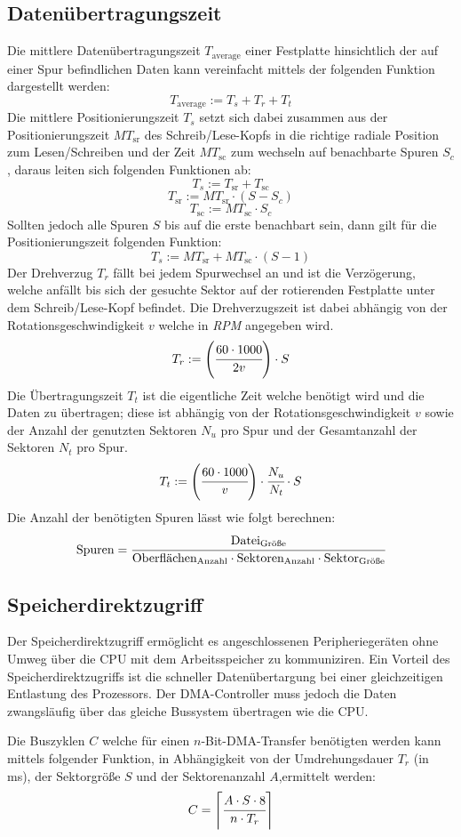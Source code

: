 \subsection{Datenübertragungszeit}
Die mittlere Datenübertragungszeit $T_{\text{average}}$ einer
Festplatte hinsichtlich der auf einer Spur befindlichen Daten kann
vereinfacht mittels der folgenden Funktion dargestellt werden:
\[
    T_{\text{average}} := T_{s} + T_{r} + T_{t}
\]
Die mittlere Positionierungszeit $T_{s}$ setzt sich dabei zusammen aus der 
Positionierungszeit $MT_{\text{sr}}$ des Schreib/Lese-Kopfs in die
richtige radiale Position zum Lesen/Schreiben und der Zeit $MT_{\text{sc}}$
zum wechseln auf benachbarte Spuren $S_{c}$, daraus leiten sich folgenden Funktionen ab:
\[
 T_{s} := T_{\text{sr}} + T_{\text{sc}}
\]
\[
 T_{\text{sr}} := MT_{\text{sr}}\cdot (S-S_{c})
\]
\[
 T_{\text{sc}} := MT_{\text{sc}}\cdot S_{c}
\]
Sollten jedoch alle Spuren $S$ bis auf die erste benachbart sein, dann gilt für
die Positionierungszeit folgenden Funktion:
\[
 T_{s} := MT_{\text{sr}} + MT_{\text{sc}}\cdot (S-1)
\]
Der Drehverzug $T_{r}$ fällt bei jedem Spurwechsel an und ist die Verzögerung,
welche anfällt bis sich der gesuchte Sektor auf der rotierenden Festplatte unter
dem Schreib/Lese-Kopf befindet. Die Drehverzugszeit ist dabei abhängig von der
Rotationsgeschwindigkeit $v$ welche in \emph{RPM} angegeben wird.
\[
 T_{r} := \left(\cfrac{60\cdot 1000}{2v}\right)\cdot S
\]
Die Übertragungszeit $T_{t}$ ist die eigentliche Zeit welche benötigt wird und die Daten
zu übertragen; diese ist abhängig von der Rotationsgeschwindigkeit $v$ sowie der Anzahl
der genutzten Sektoren $N_{u}$ pro Spur und der Gesamtanzahl der Sektoren $N_{t}$ pro Spur.
\[
 T_{t} := \left(\cfrac{60\cdot 1000}{v}\right)\cdot \cfrac{N_{u}}{N_{t}}\cdot S
\]
Die Anzahl der benötigten Spuren lässt wie folgt berechnen:
\[
\text{Spuren} = \cfrac{\text{Datei}_\text{Größe}}{\text{Oberflächen}_\text{Anzahl}\cdot \text{Sektoren}_\text{Anzahl}\cdot \text{Sektor}_\text{Größe}}
\]

\subsection{Speicherdirektzugriff}
Der Speicherdirektzugriff ermöglicht es angeschlossenen Peripheriegeräten ohne Umweg über
die CPU mit dem Arbeitsspeicher zu kommuniziren. Ein Vorteil des Speicherdirektzugriffs
ist die schneller Datenübertargung bei einer gleichzeitigen Entlastung des Prozessors.
Der DMA-Controller muss jedoch die Daten zwangsläufig über das gleiche Bussystem übertragen
wie die CPU. \par
Die Buszyklen $C$ welche für einen $n$-Bit-DMA-Transfer benötigten werden kann
mittels folgender Funktion, in Abhängigkeit von der Umdrehungsdauer $T_{r}$ (in ms), 
der Sektorgröße $S$ und der Sektorenanzahl $A$,ermittelt werden:
\[
 C = \left\lceil\cfrac{A\cdot S\cdot 8}{n\cdot T_{r}}\right\rceil
\]
